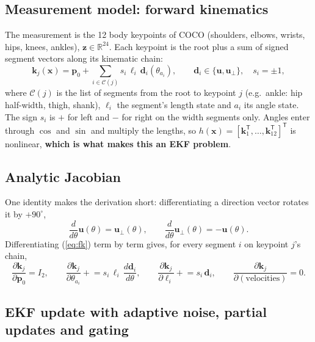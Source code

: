 \documentclass[12pt,a4paper]{article}
\newcommand{\T}{^{\mathsf{T}}}
\begin{document}
\subsection{Measurement model: forward kinematics}

The measurement is the 12 body keypoints of COCO (shoulders, elbows, wrists, hips, knees, ankles),
$\mathbf{z}\in\mathbb{R}^{24}$. Each keypoint is the root plus a sum of signed segment vectors along its
kinematic chain:
\begin{equation}
  \mathbf{k}_j(\mathbf{x}) = \mathbf{p}_0 + \sum_{i\in\mathcal{C}(j)} s_i\,\ell_i\,\mathbf{d}_i(\theta_{a_i}),
  \qquad \mathbf{d}_i\in\{\mathbf{u},\mathbf{u}_\perp\},\quad s_i=\pm1,
  \label{eq:fk}
\end{equation}
where $\mathcal{C}(j)$ is the list of segments from the root to keypoint $j$
(e.g.\ ankle: hip half-width, thigh, shank), $\ell_i$ the segment's length state and $a_i$ its angle
state. The sign $s_i$ is $+$ for left and $-$ for right on the width segments only. Angles enter through
$\cos$ and $\sin$ and multiply the lengths, so $h(\mathbf{x}) = [\mathbf{k}_1\T,\dots,\mathbf{k}_{12}\T]\T$
is nonlinear, \textbf{which is what makes this an EKF problem}.

\subsection{Analytic Jacobian}

One identity makes the derivation short: differentiating a direction vector rotates it by $+90^\circ$,
\begin{equation}
  \frac{d}{d\theta}\mathbf{u}(\theta) = \mathbf{u}_\perp(\theta),\qquad
  \frac{d}{d\theta}\mathbf{u}_\perp(\theta) = -\mathbf{u}(\theta).
\end{equation}
Differentiating (\ref{eq:fk}) term by term gives, for every segment $i$ on keypoint $j$'s chain,
\begin{equation}
  \frac{\partial\mathbf{k}_j}{\partial\mathbf{p}_0} = I_2,\qquad
  \frac{\partial\mathbf{k}_j}{\partial\theta_{a_i}} \mathrel{+}= s_i\,\ell_i\,\frac{d\mathbf{d}_i}{d\theta},\qquad
  \frac{\partial\mathbf{k}_j}{\partial\ell_i} \mathrel{+}= s_i\,\mathbf{d}_i,\qquad
  \frac{\partial\mathbf{k}_j}{\partial(\text{velocities})} = 0 .
\end{equation}


\subsection{EKF update with adaptive noise, partial updates and gating}
\label{sec:update}
\end{document}
